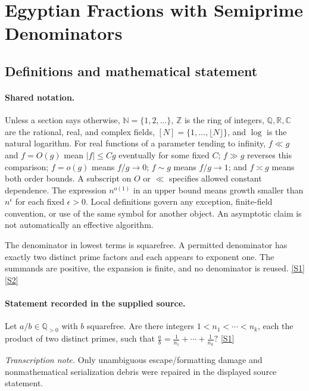 \documentclass[11pt,a4paper]{article}
\newcommand{\N}{\mathbb{N}}
\newcommand{\Z}{\mathbb{Z}}
\newcommand{\Q}{\mathbb{Q}}
\newcommand{\R}{\mathbb{R}}
\newcommand{\C}{\mathbb{C}}
\newcommand{\sref}[2]{\hyperlink{source:#1:#2}{[S#2]}}
\begin{document}
\section{Egyptian Fractions with Semiprime Denominators}\label{statement}


\subsection{Definitions and mathematical statement}

\paragraph{Shared notation.}Unless a section says otherwise, $\N=\{1,2,\ldots\}$,
$\Z$ is the ring of integers, $\Q,\R,\C$ are the rational, real, and complex
fields, $[N]=\{1,\ldots,\lfloor N\rfloor\}$, and $\log$ is the natural
logarithm. For real functions of a parameter tending to infinity,
$f\ll g$ and $f=O(g)$ mean $|f|\leq Cg$ eventually for some fixed $C$;
$f\gg g$ reverses this comparison; $f=o(g)$ means $f/g\to0$;
$f\sim g$ means $f/g\to1$; and $f\asymp g$ means both order bounds.
A subscript on $O$ or $\ll$ specifies allowed constant dependence.
The expression $n^{o(1)}$ in an upper bound means growth smaller than
$n^\epsilon$ for each fixed $\epsilon>0$. Local definitions govern any
exception, finite-field convention, or use of the same symbol for another
object. An asymptotic claim is not automatically an effective algorithm.



The denominator in lowest terms is squarefree. A permitted denominator has exactly two distinct prime factors and each appears to exponent one. The summands are positive, the expansion is finite, and no denominator is reused. \sref{statement}{1} \sref{statement}{2}

\paragraph{Statement recorded in the supplied source.}
Let $a/b\in \mathbb{Q}_{>0}$ with $b$ squarefree. Are there integers $1<n_1<\cdots<n_k$, each the product of two distinct primes, such that $ \frac{a}{b}=\frac{1}{n_1}+\cdots+\frac{1}{n_k}? $ \sref{statement}{1}

{\small\emph{Transcription note.} Only unambiguous escape/formatting damage and nonmathematical serialization debris were repaired in the displayed source statement.}
\end{document}
